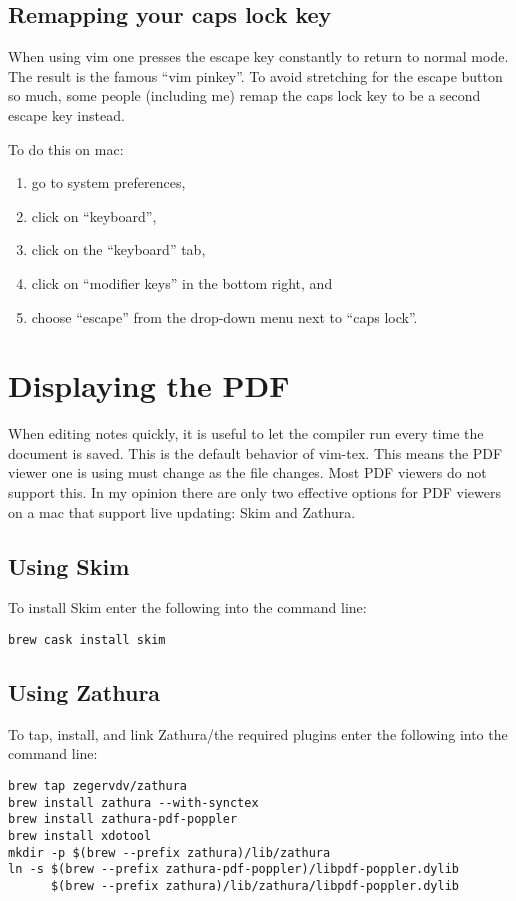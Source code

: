 \documentclass{amsart}
\begin{document}
\subsection{Remapping your caps lock key}

When using vim one presses the escape key constantly to return to normal mode. The result
is the famous ``vim pinkey''. To avoid stretching for the escape button so much, some
people (including me) remap the caps lock key to be a second escape key instead. 

To do this on mac:
\begin{enumerate}
\item go to system preferences,
\item click on ``keyboard'', 
\item click on the ``keyboard'' tab, 
\item click on ``modifier keys'' in the bottom right, and
\item choose ``escape'' from the drop-down menu next to ``caps lock''.
\end{enumerate}

\section{Displaying the PDF}

When editing notes quickly, it is useful to let the compiler run every time the document
is saved. This is the default behavior of vim-tex. This means the PDF viewer one is using must
change as the file changes. Most PDF viewers do not support this. 
In my opinion there are only two effective options for PDF viewers on a mac that support
live updating: Skim and Zathura.

\subsection{Using Skim}

To install Skim enter the following into the command line:
\begin{center}
\begin{verbatim}
brew cask install skim
\end{verbatim}
\end{center}

\subsection{Using Zathura}

To tap, install, and link Zathura/the required plugins 
enter the following into the command line:
\begin{center}
\begin{verbatim}
brew tap zegervdv/zathura
brew install zathura --with-synctex
brew install zathura-pdf-poppler
brew install xdotool
mkdir -p $(brew --prefix zathura)/lib/zathura
ln -s $(brew --prefix zathura-pdf-poppler)/libpdf-poppler.dylib 
      $(brew --prefix zathura)/lib/zathura/libpdf-poppler.dylib
\end{verbatim}
\end{center}
\end{document}
